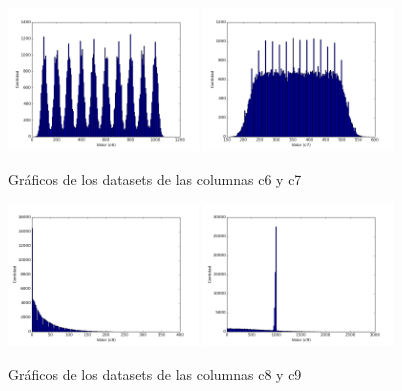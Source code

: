  
\begin{figure}[h!]
  \centering
  \includegraphics[width=0.45\textwidth]{./../source/datasets/img/c6}
  \includegraphics[width=0.45\textwidth]{./../source/datasets/img/c7}
  \caption{Gráficos de los datasets de las columnas c6 y c7}
 \end{figure}
 
 
\begin{figure}[h!]
  \centering
  \includegraphics[width=0.45\textwidth]{./../source/datasets/img/c8}
  \includegraphics[width=0.45\textwidth]{./../source/datasets/img/c9}
  \caption{Gráficos de los datasets de las columnas c8 y c9}
 \end{figure}
 
 

